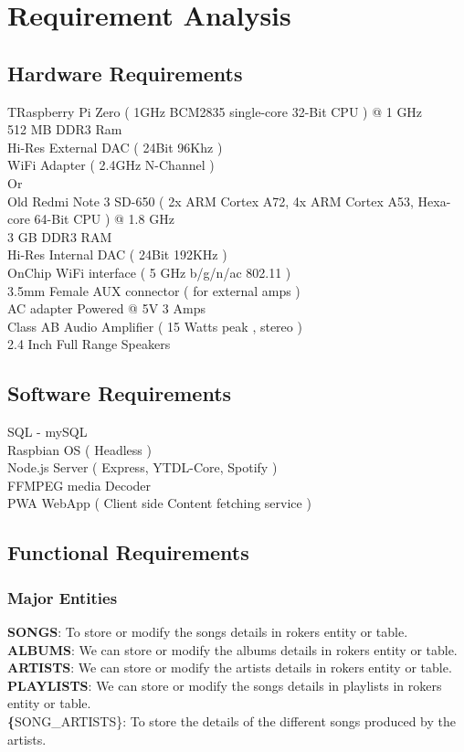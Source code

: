 \chapter{Requirement Analysis}

\section{Hardware Requirements}
TRaspberry Pi Zero ( 1GHz BCM2835 single-core 32-Bit CPU ) @ 1 GHz\\
512 MB DDR3 Ram \\
Hi-Res External DAC ( 24Bit 96Khz )\\
WiFi Adapter ( 2.4GHz N-Channel )\\
Or\\
Old Redmi Note 3 SD-650 ( 2x ARM Cortex A72, 4x ARM Cortex A53, Hexa-core 64-Bit CPU ) @ 1.8 GHz\\
3 GB DDR3 RAM\\
Hi-Res Internal DAC ( 24Bit 192KHz )\\
OnChip WiFi interface ( 5 GHz b/g/n/ac 802.11 )\\
3.5mm Female AUX connector ( for external amps )\\
AC adapter Powered @ 5V 3 Amps\\
Class AB Audio Amplifier ( 15 Watts peak , stereo )\\
2.4 Inch Full Range Speakers\\


\thispagestyle{fancy}

\section{Software Requirements}
SQL - mySQL\\
Raspbian OS ( Headless )\\
Node.js Server ( Express, YTDL-Core, Spotify )\\
FFMPEG media Decoder\\
PWA WebApp ( Client side Content fetching service )\\

\thispagestyle{fancy}
\pagebreak
\section{Functional Requirements}
\subsection{Major Entities}
\textbf{SONGS}: To store or modify the songs details in rokers entity or table.\\
\textbf{ALBUMS}: We can store or modify the albums details in rokers entity or table.\\
\textbf{ARTISTS}: We can store or modify the artists details in rokers entity or table.\\
\textbf{PLAYLISTS}: We can store or modify the songs details in playlists in rokers entity or table.\\
\textbf\{SONG\_ARTISTS\}: To store the details of the different songs produced by the artists.\\

